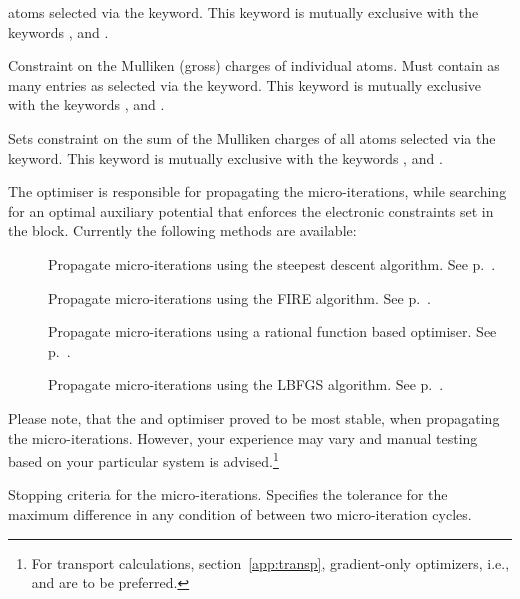 \begin{description}
\begin{description}
\begin{description}
        atoms selected via the  keyword. This keyword is mutually exclusive with the
        keywords ,  and .
      \item[\is{Charges}] Constraint on the Mulliken (gross) charges of individual atoms. Must
        contain as many entries as selected via the  keyword. This keyword is mutually
        exclusive with the keywords ,  and .
      \item[\is{TotalCharge}] Sets constraint on the sum of the Mulliken charges of all atoms selected
        via the  keyword. This keyword is mutually exclusive with the keywords
        ,  and .
      \end{description}
    \end{description}

\item[\is{Optimiser}]
  The optimiser is responsible for propagating the micro-iterations, while searching
  for an optimal auxiliary potential that enforces the electronic constraints set
  in the  block.
  Currently the following methods are available:
  \begin{description}
    \item[] Propagate micro-iterations using the
      steepest descent algorithm. See p.~.
    \item[] Propagate micro-iterations using the FIRE
      algorithm. See p.~.
    \item[] Propagate micro-iterations using a
      rational function based optimiser. See p.~.
    \item[] Propagate micro-iterations using the LBFGS
      algorithm. See p.~.
  \end{description}
  Please note, that the  and 
  optimiser proved to be most stable, when propagating the
  micro-iterations. However, your experience may vary and manual
  testing based on your particular system is advised.\footnote{For
  transport calculations, section~\ref{app:transp}, gradient-only
  optimizers, i.e.,  and  are to be
  preferred.}

\item[\is{ConstrTolerance}] Stopping criteria for the micro-iterations.
  Specifies the tolerance for the maximum difference in any condition of
   between two micro-iteration cycles.


\end{description}
